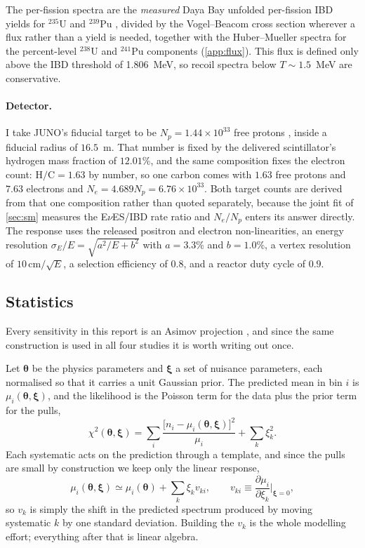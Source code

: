 \documentclass[aps,prd,superscriptaddress,nofootinbib,longbibliography,notitlepage,11pt]{revtex4-2}
\newcommand{\eves}{E$\nu$ES}
\begin{document}
The per-fission spectra are the \emph{measured} Daya Bay unfolded per-fission IBD yields
for $^{235}$U and $^{239}$Pu \cite{DayaBay:2021dqj}, divided by the Vogel--Beacom cross
section \cite{Vogel:1999zy} wherever a flux rather than a yield is needed, together with
the Huber--Mueller spectra \cite{Huber:2011wv,Mueller:2011nm} for the percent-level
$^{238}$U and $^{241}$Pu components (\cref{app:flux}).  This flux is defined only above
the IBD threshold of 1.806~MeV, so recoil spectra below $T\sim1.5$~MeV are conservative.

\paragraph{Detector.}
I take JUNO's fiducial target to be $N_p=1.44\times10^{33}$ free protons
\cite{JUNO:2025gmd,JUNO:2021vlw}, inside a fiducial radius of $16.5$~m.  That number is
fixed by the delivered scintillator's hydrogen mass fraction of $12.01\%$, and the same
composition fixes the electron count: $\mathrm{H/C}=1.63$ by number, so one carbon comes
with $1.63$ free protons and $7.63$ electrons and $N_e=4.689N_p=6.76\times10^{33}$.  Both
target counts are derived from that one composition rather than quoted separately, because
the joint fit of \cref{sec:sm} measures the \eves/IBD rate ratio and $N_e/N_p$ enters its
answer directly.  The
response uses the released positron and electron non-linearities, an energy resolution
$\sigma_E/E=\sqrt{a^2/E+b^2}$ with $a=3.3\%$ and $b=1.0\%$, a vertex resolution of
$10\,\mathrm{cm}/\sqrt{E}$, a selection efficiency of $0.8$, and a reactor duty cycle of
$0.9$.

\subsection{Statistics}
\label{sec:stats}
Every sensitivity in this report is an Asimov projection \cite{Cowan:2010js}, and since the
same construction is used in all four studies it is worth writing out once.

Let $\bm\theta$ be the physics parameters and $\bm\xi$ a set of nuisance parameters, each
normalised so that it carries a unit Gaussian prior.  The predicted mean in bin $i$ is
$\mu_i(\bm\theta,\bm\xi)$, and the likelihood is the Poisson term for the data plus the
prior term for the pulls,
\begin{equation}
\chi^2(\bm\theta,\bm\xi)=\sum_i\frac{\big[n_i-\mu_i(\bm\theta,\bm\xi)\big]^2}{\mu_i}
+\sum_k\xi_k^2 .
\label{eq:chi2pull}
\end{equation}
Each systematic acts on the prediction through a template, and since the pulls are small by
construction we keep only the linear response,
\begin{equation}
\mu_i(\bm\theta,\bm\xi)\simeq\mu_i(\bm\theta)+\sum_k\xi_k v_{ki},
\qquad
v_{ki}\equiv\frac{\partial\mu_i}{\partial\xi_k}\bigg|_{\bm\xi=0},
\label{eq:modes}
\end{equation}
so $v_k$ is simply the shift in the predicted spectrum produced by moving systematic $k$ by
one standard deviation.  Building the $v_k$ is the whole modelling effort; everything after
that is linear algebra.
\end{document}
